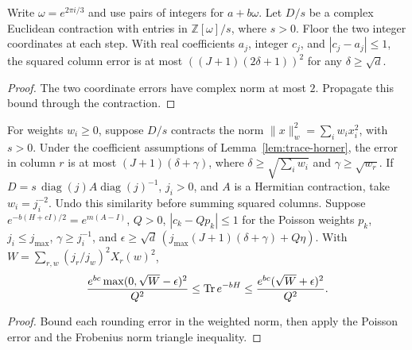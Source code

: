 \begin{lemma}
  \label{lem:trace-eisenstein}
  \leanok
  Write \(\omega=e^{2\pi i/3}\) and use pairs of integers for \(a+b\omega\).
  Let \(D/s\) be a complex Euclidean contraction with entries in \(\mathbb Z[\omega]/s\),
  where \(s>0\). Floor the two integer coordinates at each step.
  With real coefficients \(a_j\), integer \(c_j\), and \(|c_j-a_j|\le1\), the squared column
  error is at most \(((J+1)(2\delta+1))^2\) for any \(\delta\ge\sqrt d\).
\end{lemma}
\begin{proof}
  \leanok
  The two coordinate errors have complex norm at most \(2\).
  Propagate this bound through the contraction.
\end{proof}

\begin{lemma}
  \label{lem:trace-weighted}
  \leanok
  For weights \(w_i\ge0\), suppose \(D/s\) contracts the norm
  \(\|x\|_w^2=\sum_i w_i x_i^2\), with \(s>0\).
  Under the coefficient assumptions of Lemma~\ref{lem:trace-horner}, the error in column \(r\)
  is at most \((J+1)(\delta+\gamma)\), where
  \(\delta\ge\sqrt{\sum_iw_i}\) and \(\gamma\ge\sqrt{w_r}\).
  If \(D=s\,\operatorname{diag}(j)A\operatorname{diag}(j)^{-1}\), \(j_i>0\), and \(A\) is a
  Hermitian contraction, take \(w_i=j_i^{-2}\).
  Undo this similarity before summing squared columns. Suppose
  \(e^{-b(H+cI)/2}=e^{m(A-I)}\), \(Q>0\), \(|c_k-Qp_k|\le1\) for the Poisson weights \(p_k\),
  \(j_i\le j_{\max}\), \(\gamma\ge j_i^{-1}\), and
  \(\epsilon\ge\sqrt d\,(j_{\max}(J+1)(\delta+\gamma)+Q\eta)\). With
  \(W=\sum_{r,w}(j_r/j_w)^2X_r(w)^2\),
  \[
    \frac{e^{bc}\max(0,\sqrt W-\epsilon)^2}{Q^2}\le\operatorname{Tr} e^{-bH}
    \le\frac{e^{bc}(\sqrt W+\epsilon)^2}{Q^2}.
  \]
\end{lemma}
\begin{proof}
  \leanok
  Bound each rounding error in the weighted norm, then apply the Poisson error and the
  Frobenius norm triangle inequality.
\end{proof}

